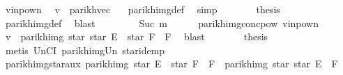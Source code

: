 \begin{isabellebody}
\ v{\isacharunderscore}{\kern0pt}in{\isacharunderscore}{\kern0pt}pow{\isacharunderscore}{\kern0pt}n\ \isamarkupfalse%
\ {\isachardoublequoteopen}v\ {\isacharequal}{\kern0pt}\ parikh{\isacharunderscore}{\kern0pt}vec\ {\isacharbrackleft}{\kern0pt}{\isacharbrackright}{\kern0pt}{\isachardoublequoteclose}\ \isamarkupfalse%
\ parikh{\isacharunderscore}{\kern0pt}img{\isacharunderscore}{\kern0pt}def\ \isamarkupfalse%
\ simp\isanewline
\ \ \ \ \isamarkupfalse%
\ \isamarkupfalse%
\ {\isacharquery}{\kern0pt}thesis\ \isamarkupfalse%
\ parikh{\isacharunderscore}{\kern0pt}img{\isacharunderscore}{\kern0pt}def\ \isamarkupfalse%
\ blast\isanewline
\ \ \isamarkupfalse%
\isanewline
\ \ \ \ \isamarkupfalse%
\ {\isacharparenleft}{\kern0pt}Suc\ m{\isacharparenright}{\kern0pt}\isanewline
\ \ \ \ \isamarkupfalse%
\ parikh{\isacharunderscore}{\kern0pt}img{\isacharunderscore}{\kern0pt}conc{\isacharunderscore}{\kern0pt}pow{}\ v{\isacharunderscore}{\kern0pt}in{\isacharunderscore}{\kern0pt}pow{\isacharunderscore}{\kern0pt}n\ \isamarkupfalse%
\ {\isachardoublequoteopen}v\ {\isasymin}\ parikh{\isacharunderscore}{\kern0pt}img\ {\isacharparenleft}{\kern0pt}star\ {\isacharparenleft}{\kern0pt}star\ E{\isacharparenright}{\kern0pt}\ {\isacharat}{\kern0pt}{\isacharat}{\kern0pt}\ star\ F\ {\isacharat}{\kern0pt}{\isacharat}{\kern0pt}\ F{\isacharparenright}{\kern0pt}{\isachardoublequoteclose}\ \isamarkupfalse%
\ blast\isanewline
\ \ \ \ \isamarkupfalse%
\ \isamarkupfalse%
\ {\isacharquery}{\kern0pt}thesis\ \isamarkupfalse%
\ {\isacharparenleft}{\kern0pt}metis\ UnCI\ parikh{\isacharunderscore}{\kern0pt}img{\isacharunderscore}{\kern0pt}Un\ star{\isacharunderscore}{\kern0pt}idemp{\isacharparenright}{\kern0pt}\isanewline
\ \ \isamarkupfalse%
\isanewline
{}\isamarkupfalse%
%
\endisatagproof
{\isafoldproof}%
%
\isadelimproof
\isanewline
%
\endisadelimproof
\isanewline
{}\isamarkupfalse%
\ parikh{\isacharunderscore}{\kern0pt}img{\isacharunderscore}{\kern0pt}star{}{\isacharunderscore}{\kern0pt}aux{}{\isacharcolon}{\kern0pt}\ {\isachardoublequoteopen}parikh{\isacharunderscore}{\kern0pt}img\ {\isacharparenleft}{\kern0pt}star\ E\ {\isacharat}{\kern0pt}{\isacharat}{\kern0pt}\ star\ F\ {\isacharat}{\kern0pt}{\isacharat}{\kern0pt}\ F{\isacharparenright}{\kern0pt}\ {\isasymsubseteq}\ parikh{\isacharunderscore}{\kern0pt}img\ {\isacharparenleft}{\kern0pt}star\ {\isacharparenleft}{\kern0pt}star\ E\ {\isacharat}{\kern0pt}{\isacharat}{\kern0pt}\ F{\isacharparenright}{\kern0pt}{\isacharparenright}{\kern0pt}{\isachardoublequoteclose}\isanewline

\end{isabellebody}
